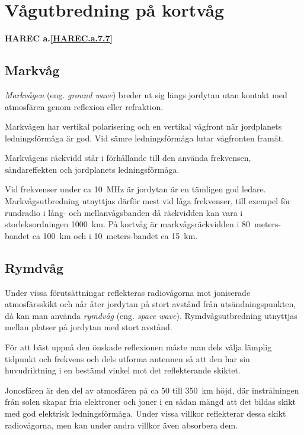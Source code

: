 \section{Vågutbredning på kortvåg}
\textbf{
HAREC a.\ref{HAREC.a.7.7}\label{myHAREC.a.7.7}
}

\subsection{Markvåg}

\emph{Markvågen} (eng. \emph{ground wave}) breder ut sig längs jordytan utan
kontakt med atmosfären genom reflexion eller refraktion.

Markvågen har vertikal polarisering och en vertikal vågfront när
jordplanets ledningsförmåga är god.
Vid sämre ledningsförmåga lutar vågfronten framåt.

Markvågens räckvidd står i förhållande till den använda frekvensen,
sändareffekten och jordplanets ledningsförmåga.

Vid frekvenser under ca 10~MHz är jordytan är en tämligen god ledare.
Markvågsutbredning utnyttjas därför mest vid låga frekvenser, till exempel för
rundradio i lång- och mellanvågsbanden då räckvidden kan vara i
storleksordningen 1000~km.
På kortvåg är markvågsräckvidden i 80~meters-bandet ca 100~km och i
10~meters-bandet ca 15~km.

\subsection{Rymdvåg}

Under vissa förutsättningar reflekteras radiovågorna mot joniserade
atmosfärsskikt och når åter jordytan på stort avstånd från utsändningspunkten,
då kan man använda \emph{rymdvåg} (eng. \emph{space wave}).
Rymdvågsutbredning utnyttjas mellan platser på jordytan med stort avstånd.

För att bäst uppnå den önskade reflexionen måste man dels välja
lämplig tidpunkt och frekvens och dels utforma antennen så att den har
sin huvudriktning i en bestämd vinkel mot det reflekterande skiktet.

Jonosfären är den del av atmosfären på ca 50 till 350~km höjd, där
instrålningen från solen skapar fria elektroner och joner i en sådan
mängd att det bildas skikt med god elektrisk ledningsförmåga.
Under vissa villkor reflekterar dessa skikt radiovågorna, men kan under
andra villkor även absorbera dem.

